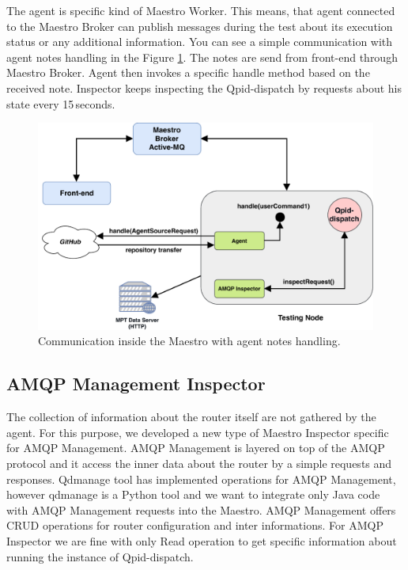 The agent is specific kind of Maestro Worker. This means, that agent connected to the Maestro Broker can publish messages during the test about its execution status or any additional information. You can see a simple communication with agent notes handling in the Figure \ref{fig:agent_demo}. The notes are send from front-end through Maestro Broker. Agent then invokes a specific handle method based on the received note. Inspector keeps inspecting the Qpid-dispatch by requests about his state every 15\,seconds.

\begin{figure}[H]
  \centering
  \includegraphics[width=15cm]{obrazky-figures/agent_demo.pdf}
  \caption{Communication inside the Maestro with agent notes handling.}
  \label{fig:agent_demo}
\end{figure}


\subsection{AMQP Management Inspector}
\label{AMQP Management Inspector}
The collection of information about the router itself are not gathered by the agent. For this purpose, we developed a new type of Maestro Inspector specific for AMQP Management. AMQP Management is layered on top of the AMQP protocol and it access the inner data about the router by a simple requests and responses. Qdmanage tool has implemented operations for AMQP Management, however qdmanage is a Python tool and we want to integrate only Java code with AMQP Management requests into the Maestro. AMQP Management offers CRUD operations for router configuration and inter informations. For AMQP Inspector we are fine with only Read operation to get specific information about running the instance of Qpid-dispatch.

